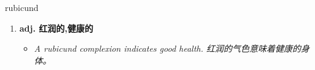 
\begin{frame}
{\huge rubicund}
\begin{center}
\begin{enumerate}\Large
  \item \textbf{adj. 红润的,健康的}
  \begin{itemize}
    \item \em{\Large{A rubicund complexion indicates good health. 红润的气色意味着健康的身体。}}
  \end{itemize}
\end{enumerate}
\end{center}
\end{frame}
